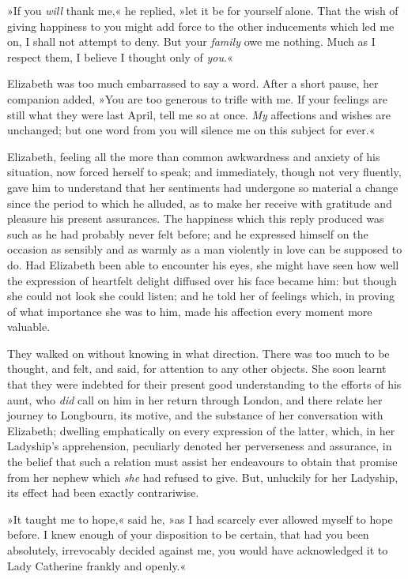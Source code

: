 »If you \textit{will} thank me,« he replied, »let it be for yourself alone. That the wish of giving happiness to you might add force to the other inducements which led me on, I shall not attempt to deny. But your \textit{family} owe me nothing. Much as I respect them, I believe I thought only of \textit{you}.«

Elizabeth was too much embarrassed to say a word. After a short pause, her companion added, »You are too generous to trifle with me. If your feelings are still what they were last April, tell me so at once. \textit{My} affections and wishes are unchanged; but one word from you will silence me on this subject for ever.«

Elizabeth, feeling all the more than common awkwardness and anxiety of his situation, now forced herself to speak; and immediately, though not very fluently, gave him to understand that her sentiments had undergone so material a change since the period to which he alluded, as to make her receive with gratitude and pleasure his present assurances. The happiness which this reply produced was such as he had probably never felt before; and he expressed himself on the occasion as sensibly and as warmly as a man violently in love can be supposed to do. Had Elizabeth been able to encounter his eyes, she might have seen how well the expression of heartfelt delight diffused over his face became him: but though she could not look she could listen; and he told her of feelings which, in proving of what importance she was to him, made his affection every moment more valuable.

They walked on without knowing in what direction. There was too much to be thought, and felt, and said, for attention to any other objects. She soon learnt that they were indebted for their present good understanding to the efforts of his aunt, who \textit{did} call on him in her return through London, and there relate her journey to Longbourn, its motive, and the substance of her conversation with Elizabeth; dwelling emphatically on every expression of the latter, which, in her Ladyship's apprehension, peculiarly denoted her perverseness and assurance, in the belief that such a relation must assist her endeavours to obtain that promise from her nephew which \textit{she} had refused to give. But, unluckily for her Ladyship, its effect had been exactly contrariwise.

»It taught me to hope,« said he, »as I had scarcely ever allowed myself to hope before. I knew enough of your disposition to be certain, that had you been absolutely, irrevocably decided against me, you would have acknowledged it to Lady Catherine frankly and openly.«

